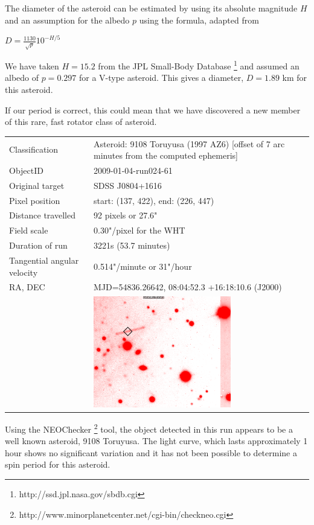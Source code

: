 The diameter of the asteroid can be estimated by using its absolute magnitude $H$ and an assumption for the albedo $p$ using the formula, adapted from \citet{Jewitt2013}

$D = \frac{1130}{\sqrt{p}}10^{-H/5} $

We have taken $H = 15.2$ from the JPL Small-Body Database \footnote{http://ssd.jpl.nasa.gov/sbdb.cgi} and assumed an albedo of $ p = 0.297$ for a V-type asteroid. This gives a diameter, $D = 1.89$ km for this asteroid. 

If our period is correct, this could mean that we have discovered a new member of this rare, fast rotator class of asteroid. 

\newpage

\begin{tabular}{l l}
  Classification & Asteroid: 9108 Toruyusa (1997 AZ6) [offset of 7 arc minutes from the computed ephemeris]\\
  ObjectID & 2009-01-04-run024-61 \\
  Original target & SDSS J0804+1616 \\
  Pixel position & start: (137, 422), end: (226, 447) \\
  Distance travelled & 92 pixels or 27.6" \\
  Field scale & 0.30"/pixel for the WHT \\
  Duration of run & 3221s (53.7 minutes) \\
  Tangential angular velocity & 0.514"/minute or 31"/hour\\ 
  RA, DEC & MJD=54836.26642, 08:04:52.3 +16:18:10.6 (J2000) \\
       & \includegraphics[width=60mm]{images/2009-01-04-run024-61.png} \\
  \end{tabular}

  Using the NEOChecker \footnote{http://www.minorplanetcenter.net/cgi-bin/checkneo.cgi} tool, the object detected in this run appears to be a well known asteroid, 9108 Toruyusa. The light curve, which lasts approximately 1 hour shows no significant variation and it has not been possible to determine a spin period for this asteroid.  

  
